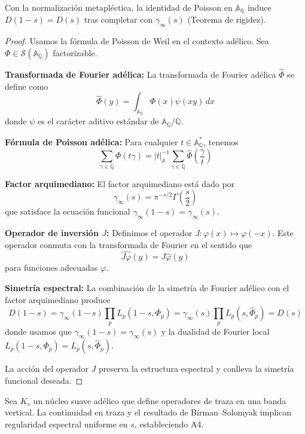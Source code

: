 \begin{lemma}\label{lem:A2}
Con la normalización metapléctica, la identidad de Poisson en $\mathbb{A}_\mathbb{Q}$
induce $D(1-s) = D(s)$ tras completar con $\gamma_\infty(s)$ (Teorema de rigidez).
\end{lemma}

\begin{proof}
Usamos la fórmula de Poisson de Weil \cite{Weil1964} en el contexto adélico. Sea $\Phi \in \mathcal{S}(\mathbb{A}_\mathbb{Q})$ factorizable.

\textbf{Transformada de Fourier adélica:} La transformada de Fourier adélica $\hat{\Phi}$ se define como
\[
\hat{\Phi}(y) = \int_{\mathbb{A}_\mathbb{Q}} \Phi(x) \psi(xy) \, dx
\]
donde $\psi$ es el carácter aditivo estándar de $\mathbb{A}_\mathbb{Q}/\mathbb{Q}$.

\textbf{Fórmula de Poisson adélica:} Para cualquier $t \in \mathbb{A}_\mathbb{Q}^\ast$, tenemos
\[
\sum_{\gamma \in \mathbb{Q}} \Phi(t\gamma) = |t|_{\mathbb{A}}^{-1} \sum_{\gamma \in \mathbb{Q}} \hat{\Phi}\left(\frac{\gamma}{t}\right)
\]

\textbf{Factor arquimediano:} El factor arquimediano está dado por
\[
\gamma_\infty(s) = \pi^{-s/2} \Gamma\left(\frac{s}{2}\right)
\]
que satisface la ecuación funcional $\gamma_\infty(1-s) = \gamma_\infty(s)$.

\textbf{Operador de inversión $J$:} Definimos el operador $J : \varphi(x) \mapsto \varphi(-x)$. Este operador conmuta con la transformada de Fourier en el sentido que
\[
\widehat{J\varphi}(y) = J\hat{\varphi}(y)
\]
para funciones adecuadas $\varphi$.

\textbf{Simetría espectral:} La combinación de la simetría de Fourier adélico con el factor arquimediano produce
\[
D(1-s) = \gamma_\infty(1-s) \prod_{p} L_p(1-s, \Phi_p) = \gamma_\infty(s) \prod_{p} L_p(s, \hat{\Phi}_p) = D(s)
\]
donde usamos que $\gamma_\infty(1-s) = \gamma_\infty(s)$ y la dualidad de Fourier local $L_p(1-s, \Phi_p) = L_p(s, \hat{\Phi}_p)$.

La acción del operador $J$ preserva la estructura espectral y conlleva la simetría funcional deseada.
\end{proof}

\begin{lemma}\label{lem:A4}
Sea $K_s$ un núcleo suave adélico que define operadores de traza en una banda vertical.
La continuidad en traza y el resultado de Birman--Solomyak implican regularidad
espectral uniforme en $s$, estableciendo A4.
\end{lemma}

